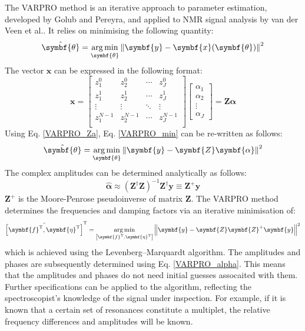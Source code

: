 The \ac{VARPRO} method is an iterative approach to parameter estimation, developed by Golub and Pereyra\cite{Golub1973}, and applied to NMR signal analysis by van der Veen et al.\cite{VanDerVeen1988}. It relies on minimising the following quantity:
\begin{equation}
  \label{VARPRO_min}
  \hat{\symbf{\theta}} = \argmin_{\symbf{\theta}} \left \lVert \symbf{y} - \symbf{x}(\symbf{\theta}) \right \rVert^2
\end{equation}
The vector $\symbf{x}$ can be expressed in the following format:
\begin{equation}
  \label{VARPRO_Za}
  \symbf{x} =
  \begin{bmatrix}
    z_1^0 & z_2^0 & \cdots & z_J^0\\
    z_1^1 & z_2^1 & \cdots & z_J^1\\
    \vdots & \vdots & \ddots & \vdots\\
    z_1^{N-1} & z_2^{N-1} & \cdots & z_J^{N-1}\\
  \end{bmatrix}
  \begin{bmatrix}
    \alpha_1\\
    \alpha_2\\
    \vdots\\
    \alpha_J
  \end{bmatrix}
  = \symbf{Z}\symbf{\alpha}
\end{equation}
Using Eq. \ref{VARPRO_Za}, Eq. \ref{VARPRO_min} can be re-written as follows:
\begin{equation}
    \hat{\symbf{\theta}} = \argmin_{\symbf{\theta}} \left \lVert \symbf{y} - \symbf{Z}\symbf{\alpha} \right \rVert^2
\end{equation}
The complex amplitudes can be determined analytically as follows:
\begin{equation}
  \label{VARPRO_alpha}
  \hat{\symbf{\alpha}} \approx \left( \symbf{Z}^{\dagger} \symbf{Z} \right)^{-1} \symbf{Z}^{\dagger} \symbf{y} \equiv \symbf{Z}^+ \symbf{y}
\end{equation}
$\symbf{Z}^+$ is the Moore-Penrose pseudoinverse of matrix $\symbf{Z}$\cite{Penrose1955, Strang2018}. The VARPRO method determines the frequencies and damping factors via an iterative minimisation of:
\begin{equation}
  \hat{\left[\symbf{f}^{\mathrm{T}}, \symbf{\eta}^{\mathrm{T}}\right]}^{\mathrm{T}} = \argmin_{\left[\symbf{f}^{\mathrm{T}}, \symbf{\eta}^{\mathrm{T}}\right]} \left \lVert \symbf{y} - \symbf{Z}\symbf{Z}^+\symbf{y} \right \rVert^2
\end{equation}
which is achieved using the Levenberg–Marquardt algorithm\cite{Levenberg1944, Marquardt1963}. The amplitudes and phases are subsequently determined using Eq. \ref{VARPRO_alpha}. This means that the amplitudes and phases do not need initial guesses assocaited with them. Further specifications can be applied to the algorithm, reflecting the spectroscopist's knowledge of the signal under inspection. For example, if it is known that a certain set of resonances constitute a multiplet, the relative frequency differences and amplitudes will be known.

